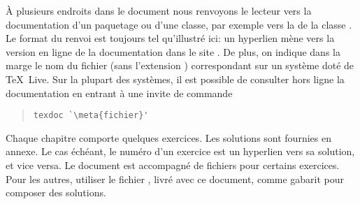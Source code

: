 À plusieurs endroits dans le document nous renvoyons le lecteur vers
la documentation d'un paquetage ou d'une classe, par exemple vers la %
de la classe . Le format du renvoi est toujours tel
qu'illustré ici: un hyperlien mène vers la version en ligne de la
documentation dans le site %
. De plus, on indique dans la
marge le nom du fichier (sans l'extension ) correspondant
sur un système doté de {\TeX}~Live. Sur la plupart des systèmes, il
est possible de consulter hors ligne la documentation
 en entrant à une invite de commande
\begin{quote}
\begin{lstlisting}[backgroundcolor=\color{white}]
texdoc `\meta{fichier}'
\end{lstlisting}
\end{quote}


Chaque chapitre comporte quelques exercices. Les solutions sont
fournies en annexe. Le cas échéant, le numéro d'un exercice est un
hyperlien vers sa solution, et vice versa. Le document est accompagné
de fichiers pour certains exercices. Pour les autres, utiliser le
fichier , livré avec ce document, comme
gabarit pour composer des solutions.

